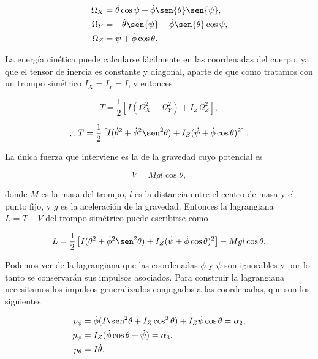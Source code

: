 \documentclass[a4paper,10pt]{article}
\numberwithin{equation}{section}
\begin{document}
\begin{align}
 \begin{split}
   \Omega_X &= \dot{\theta}\cos{\psi} + \dot{\phi}\sen{\theta}\sen{\psi}, \\
  \Omega_Y &= - \dot{\theta}\sen{\psi} + \dot{\phi}\sen{\theta}\cos{\psi}, \\
   \Omega_Z &= \dot{\psi} + \dot{\phi}\cos{\theta}.
 \end{split}
\end{align}

La energía cinética puede calcularse fácilmente en las coordenadas del cuerpo, ya que 
el tensor de inercia es constante y diagonal, aparte de que como tratamos con un 
trompo simétrico $I_X = I_Y = I$, y entonces 

\begin{equation}
 T = \frac{1}{2}[I(\Omega_X^2 + \Omega_Y^2) + I_Z\Omega_Z^2],
\end{equation}

\begin{equation}
 \therefore T = \frac{1}{2}\left[I(\dot{\theta}^2 + \dot{\phi}^2\sen^2{\theta})
 + I_Z(\dot{\psi} + \dot{\phi}\cos{\theta})^2\right].
\end{equation}

La única fuerza que interviene es la de la gravedad cuyo potencial es 

\begin{equation}
 V = Mgl\cos{\theta},
\end{equation}

donde $M$ es la masa del trompo, $l$ es la distancia entre el centro de masa y 
el punto fijo, y $g$ es la aceleración de la gravedad. Entonces la lagrangiana 
$L = T - V$ del trompo simétrico puede escribirse como 

\begin{equation}
 L = \frac{1}{2}\left[I(\dot{\theta}^2 + \dot{\phi}^2\sen^2{\theta})
 + I_Z(\dot{\psi} + \dot{\phi}\cos{\theta})^2\right] - Mgl\cos{\theta}.
\end{equation}

Podemos ver de la lagrangiana que las coordenadas $\phi$ y $\psi$ son ignorables y 
por lo tanto se conservarán sus impulsos asociados. Para 
construir la lagrangiana necesitamos los impulsos generalizados conjugados a las 
coordenadas, que son los siguientes

\begin{align}
 p_\phi &= \dot{\phi}(I\sen^2{\theta} + I_Z\cos^2{\theta}) + I_Z\dot{\psi}\cos{\theta} = \alpha_2, \\
 p_\psi &= I_Z(\dot{\phi}\cos{\theta} + \dot{\psi}) = \alpha_3, \\
 p_\theta &= I\dot{\theta}.
\end{align}
\end{document}
